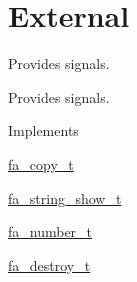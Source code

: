 \hypertarget{group___fa_signal_external}{\section{External}
\label{group___fa_signal_external}
}


Provides signals.  


Provides signals. \begin{DoxyParagraph}{Implements}

\begin{DoxyItemize}
\item \hyperlink{structfa__copy__t}{fa\-\_\-copy\-\_\-t}
\item \hyperlink{structfa__string__show__t}{fa\-\_\-string\-\_\-show\-\_\-t}
\item \hyperlink{structfa__number__t}{fa\-\_\-number\-\_\-t}
\item \hyperlink{structfa__destroy__t}{fa\-\_\-destroy\-\_\-t} 
\end{DoxyItemize}
\end{DoxyParagraph}
